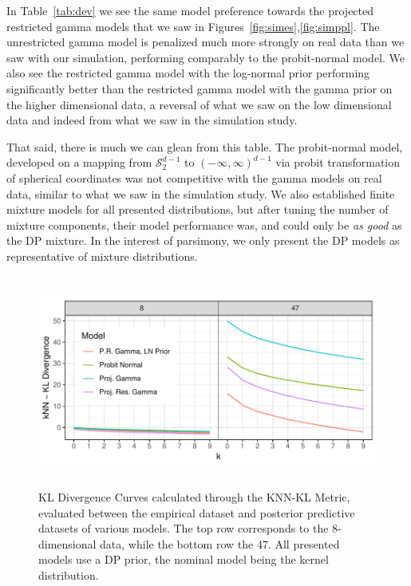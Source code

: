 In Table~\ref{tab:dev} we see the same model preference towards the projected restricted gamma models
  that we saw in Figures~\ref{fig:simes},\ref{fig:simppl}.  The unrestricted gamma model is penalized much
  more strongly on real data than we saw with our simulation, performing comparably to the probit-normal
  model.  We also see the restricted gamma model with the log-normal prior performing significantly
  better than the restricted gamma model with the gamma prior on the higher dimensional data, a reversal
  of what we saw on the low dimensional data and indeed from what we saw in the simulation study.

That said, there is much we can glean from this table.  The probit-normal model, developed on a mapping
  from $\mathcal{S}_{2}^{d-1}$ to $(-\infty,\infty)^{d-1}$ via probit transformation of spherical coordinates
  was not competitive with the gamma models on real data, similar to what we saw in the simulation study. We also established finite mixture
  models for all presented distributions, but after tuning the number of mixture components, their
  model performance was, and could only be \emph{as good} as the DP mixture.  In the interest of parsimony, we only present the DP models as representative of mixture distributions.

\begin{figure}[h]
  \centering
  \caption{KL Divergence Curves calculated through the KNN-KL Metric, evaluated between the
  empirical dataset and posterior predictive datasets of various models.  The top row corresponds
  to the 8-dimensional data, while the bottom row the 47.  All presented models use a DP prior, 
  the nominal model being the kernel distribution.\label{fig:knnkl}}
  \includegraphics[width = 5.5in, height = 2.75in]{./images/knn_kl_divergence_curves}
\end{figure}

